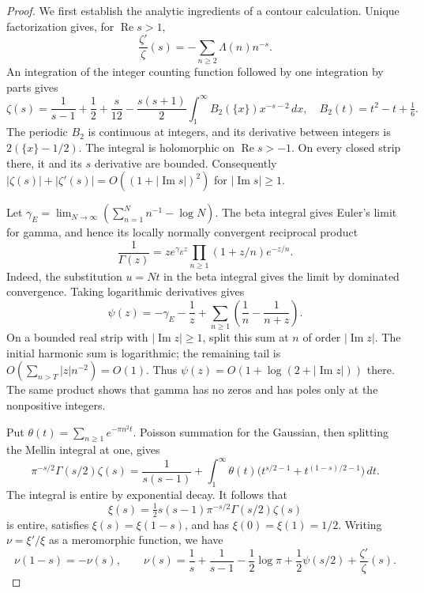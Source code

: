 \begin{proof}
We first establish the analytic ingredients of a contour calculation.
Unique factorization gives, for $\operatorname{Re}s>1$,
\begin{equation}\label{nwc:eq:dirichlet}
 \frac{\zeta'}{\zeta}(s)=-\sum_{n\geq2}\Lambda(n)n^{-s}.
\end{equation}
An integration of the integer counting function followed by one
integration by parts gives
\begin{equation}\label{nwc:eq:euler-maclaurin}
 \zeta(s)=\frac1{s-1}+\frac12+\frac{s}{12}
 -\frac{s(s+1)}2\int_1^\infty B_2(\{x\})x^{-s-2}\,dx,
 \quad B_2(t)=t^2-t+\tfrac16.
\end{equation}
The periodic $B_2$ is continuous at integers, and its derivative
between integers is $2(\{x\}-1/2)$.
The integral is holomorphic on $\operatorname{Re}s>-1$.
On every closed strip there, it and its $s$ derivative are bounded.
Consequently $|\zeta(s)|+|\zeta'(s)|=O((1+|\operatorname{Im}s|)^2)$
for $|\operatorname{Im}s|\geq1$.

Let $\gamma_E=\lim_{N\to\infty}(\sum_{n=1}^N n^{-1}-\log N)$.
The beta integral gives Euler's limit for gamma, and hence its locally
normally convergent reciprocal product
\[
 \frac1{\Gamma(z)}=ze^{\gamma_Ez}
           \prod_{n\geq1}(1+z/n)e^{-z/n}.
\]
Indeed, the substitution $u=Nt$ in the beta integral gives the limit
by dominated convergence. Taking logarithmic derivatives gives
\[
 \psi(z)=-\gamma_E-\frac1z+
       \sum_{n\geq1}\left(\frac1n-\frac1{n+z}\right).
\]
On a bounded real strip with $|\operatorname{Im}z|\geq1$, split
this sum at $n$ of order $|\operatorname{Im}z|$.
The initial harmonic sum is logarithmic; the remaining tail is
$O(\sum_{n>T}|z|n^{-2})=O(1)$.
Thus $\psi(z)=O(1+\log(2+|\operatorname{Im}z|))$ there.
The same product shows that gamma has no zeros and has poles only
at the nonpositive integers.

Put $\theta(t)=\sum_{n\geq1}e^{-\pi n^2t}$.
Poisson summation for the Gaussian, then splitting the Mellin integral
at one, gives
\begin{equation}\label{nwc:eq:xi-integral}
 \pi^{-s/2}\Gamma(s/2)\zeta(s)
 =\frac1{s(s-1)}+
 \int_1^\infty\theta(t)
       \bigl(t^{s/2-1}+t^{(1-s)/2-1}\bigr)\,dt.
\end{equation}
The integral is entire by exponential decay.
It follows that
\[
 \xi(s)=\tfrac12s(s-1)\pi^{-s/2}\Gamma(s/2)\zeta(s)
\]
is entire, satisfies $\xi(s)=\xi(1-s)$, and has
$\xi(0)=\xi(1)=1/2$.
Writing $\nu=\xi'/\xi$ as a meromorphic function, we have
\begin{equation}\label{nwc:eq:logderivative}
 \nu(1-s)=-\nu(s),\qquad
 \nu(s)=\frac1s+\frac1{s-1}-\frac12\log\pi
               +\frac12\psi(s/2)+\frac{\zeta'}{\zeta}(s).
\end{equation}


\end{proof}
